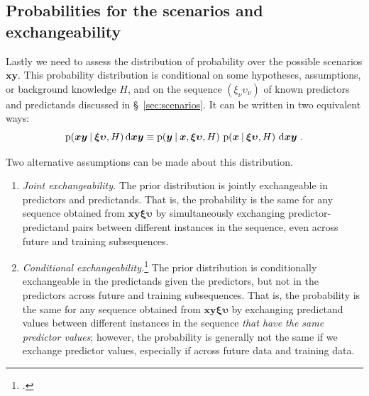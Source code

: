 \documentclass[\ifafour a4paper,12pt,\else a5paper,10pt,\fi%
onecolumn,oneside,article,%
british%
]{memoir}
\theoremstyle{remark}
\theoremstyle{innote}
\newcommand*{\citep}{\footcites}
\newcommand*{\di}{\mathrm{d}}%
\newcommand*{\p}{\mathrm{p}}%
\renewcommand*{\|}[1][]{\nonscript\:#1\vert\nonscript\:\mathopen{}}
\renewcommand*{\=}{\TextOrMath\texteq\eq}
\newcommand*{\sect}{\S}%
\newcommand*{\bx}{\bm{x}}
\newcommand*{\by}{\bm{y}}
\newcommand*{\bz}{\bm{xy}}
\newcommand*{\yxx}[1]{\xi_{#1}}
\newcommand*{\yyy}[1]{\upsilon_{#1}}
\newcommand*{\bzz}{\bm{\xi\upsilon}}
\begin{document}
\subsection{Probabilities for the scenarios and exchangeability}
\label{sec:scenario_probabilities}

Lastly we need to assess the distribution of probability over the possible
scenarios $\bz$. This probability distribution is conditional on some
hypotheses, assumptions, or background knowledge $H$, and on the sequence
$(\yxx{\nu}\yyy{\nu})$ of known predictors and predictands discussed in
\sect~\ref{sec:scenarios}. It can be written in two equivalent ways:
\begin{equation}
  \label{eq:prob_distr_conditional}
  \p(\bz \| \bzz, H)\,\di\bz
  \equiv
  \p(\by\| \bx, \bzz, H)\ \p(\bx \| \bzz, H)\ \di\bz \ .
\end{equation}

Two alternative assumptions can be made about this distribution.
\begin{enumerate}[label=(\Roman*),para]
\item\label{item:full_exchangeability} \emph{Joint exchangeability.} The
  prior distribution is jointly exchangeable in predictors and predictands.
  That is, the probability is the same for any sequence obtained from
  $\bz\bzz$ by simultaneously exchanging predictor-predictand pairs between
  different instances in the sequence, even across future and training
  subsequences.
\item\label{item:conditional_exchangeability} \emph{Conditional
    exchangeability.}\citep[\sect~4.6.2]{bernardoetal1994_r2000}[\sect~3]{diaconis1988}[\sect~3,
  Appendix~2]{lindleyetal1981} The prior distribution is conditionally
  exchangeable in the predictands given the predictors, but not in the
  predictors across future and training subsequences. That is, the
  probability is the same for any sequence obtained from $\bz\bzz$ by
  exchanging predictand values between different instances in the sequence
  \emph{that have the same predictor values}; however, the probability is
  generally not the same if we exchange predictor values, especially if
  across future data and training data.
\end{enumerate}
\end{document}
